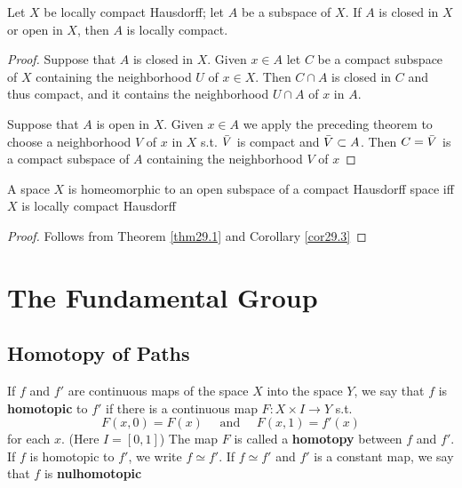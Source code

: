 \documentclass[11pt]{article}
\begin{document}
\begin{corollary}[]
\label{cor29.3}
Let \(X\) be locally compact Hausdorff; let \(A\) be a subspace of \(X\). If \(A\) is closed
in \(X\) or open in \(X\), then \(A\) is locally compact.
\end{corollary}

\begin{proof}
Suppose that \(A\) is closed in \(X\). Given \(x\in A\) let \(C\) be a compact subspace of \(X\)
containing the neighborhood \(U\) of \(x\in X\). Then \(C\cap A\) is closed in \(C\) and thus
compact, and it contains the neighborhood \(U\cap A\) of \(x\) in \(A\).

Suppose that \(A\) is open in \(X\). Given \(x\in A\) we apply the preceding theorem to choose a
neighborhood \(V\) of \(x\) in \(X\) s.t. \(\bar{V}\) is compact and \(\bar{V}\subset A\).
Then \(C=\bar{V}\) is a compact subspace of \(A\) containing the neighborhood \(V\) of \(x\)
\end{proof}

\begin{corollary}[]
A space \(X\) is homeomorphic to an open subspace of a compact Hausdorff space iff \(X\) is
locally compact Hausdorff
\end{corollary}

\begin{proof}
Follows from Theorem \ref{thm29.1} and Corollary \ref{cor29.3}
\end{proof}



\section{The Fundamental Group}
\label{sec:orgbcb30e9}

\subsection{Homotopy of Paths}
\label{sec:org3079cbd}
\begin{definition}[]
If \(f\) and \(f'\) are continuous maps of the space \(X\) into the space \(Y\), we say
that \(f\) is \textbf{homotopic} to \(f'\) if there is a continuous map \(F:X\times I\to Y\) s.t.
\begin{equation*}
F(x,0)=F(x) \quad\text{ and }\quad
F(x,1)=f'(x)
\end{equation*}
for each \(x\). (Here \(I=[0,1]\)) The map \(F\) is called a \textbf{homotopy} between \(f\) and \(f'\).
If \(f\) is homotopic to \(f'\), we write \(f\simeq f'\). If \(f\simeq f'\) and \(f'\) is a constant map,
we say that \(f\) is \textbf{nulhomotopic}
\end{definition}
\end{document}
